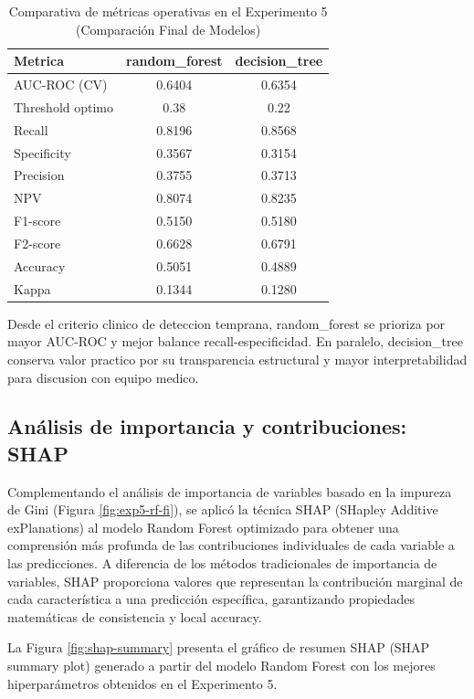 \begin{table}[H]
\centering
\caption{Comparativa de métricas operativas en el Experimento 5 (Comparación Final de Modelos)}
\label{tab:exp5-comparacion}
\begin{tabular}{|l|c|c|}
\hline
\textbf{Metrica} & \textbf{random\_forest} & \textbf{decision\_tree} \\ \hline
AUC-ROC (CV) & 0.6404 & 0.6354 \\ \hline
Threshold optimo & 0.38 & 0.22 \\ \hline
Recall & 0.8196 & 0.8568 \\ \hline
Specificity & 0.3567 & 0.3154 \\ \hline
Precision & 0.3755 & 0.3713 \\ \hline
NPV & 0.8074 & 0.8235 \\ \hline
F1-score & 0.5150 & 0.5180 \\ \hline
F2-score & 0.6628 & 0.6791 \\ \hline
Accuracy & 0.5051 & 0.4889 \\ \hline
Kappa & 0.1344 & 0.1280 \\ \hline
\end{tabular}
\end{table}

Desde el criterio clinico de deteccion temprana, random\_forest se prioriza por mayor AUC-ROC y mejor balance recall-especificidad. En paralelo, decision\_tree conserva valor practico por su transparencia estructural y mayor interpretabilidad para discusion con equipo medico.

\subsection{Análisis de importancia y contribuciones: SHAP}

Complementando el análisis de importancia de variables basado en la impureza de Gini (Figura \ref{fig:exp5-rf-fi}), se aplicó la técnica SHAP (SHapley Additive exPlanations) al modelo Random Forest optimizado para obtener una comprensión más profunda de las contribuciones individuales de cada variable a las predicciones. A diferencia de los métodos tradicionales de importancia de variables, SHAP proporciona valores que representan la contribución marginal de cada característica a una predicción específica, garantizando propiedades matemáticas de consistencia y local accuracy.

La Figura \ref{fig:shap-summary} presenta el gráfico de resumen SHAP (SHAP summary plot) generado a partir del modelo Random Forest con los mejores hiperparámetros obtenidos en el Experimento 5.

